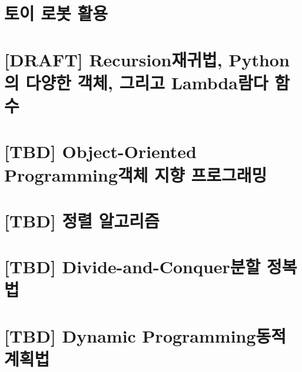 \documentclass[a4paper,10pt]{memoir}
\begin{document}
\chapter{토이 로봇 활용}


\chapter{[DRAFT] Recursion재귀법, Python의 다양한 객체, 그리고 Lambda람다 함수}


\chapter{[TBD] Object-Oriented Programming객체 지향 프로그래밍}

\chapter{[TBD] 정렬 알고리즘}

\chapter{[TBD] Divide-and-Conquer분할 정복법}

\chapter{[TBD] Dynamic Programming동적 계획법}
\end{document}
